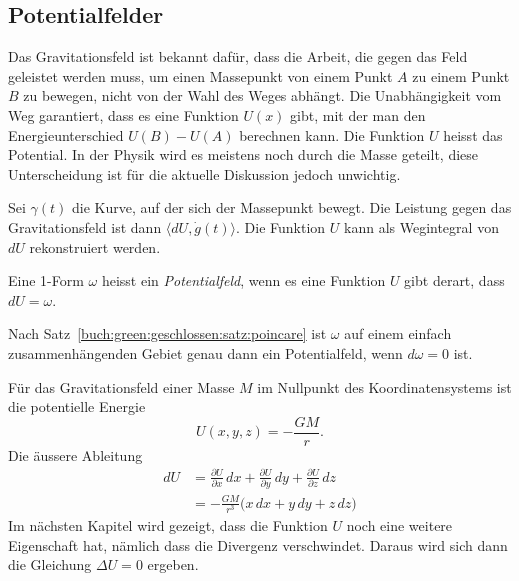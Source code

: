 %
%
\subsection{Potentialfelder}
Das Gravitationsfeld ist bekannt dafür, dass die Arbeit, die gegen
das Feld geleistet werden muss, um einen Massepunkt von einem Punkt $A$
zu einem Punkt $B$ zu bewegen, nicht von der Wahl des Weges abhängt.
Die Unabhängigkeit vom Weg garantiert, dass es
eine Funktion $U(x)$ gibt, mit der man den Energieunterschied
$U(B)-U(A)$ berechnen kann.
Die Funktion $U$ heisst das Potential.
In der Physik wird es meistens noch durch die Masse geteilt,
diese Unterscheidung ist für die aktuelle Diskussion jedoch unwichtig.

Sei $\gamma(t)$ die Kurve, auf der sich der Massepunkt 
bewegt.
Die Leistung gegen das Gravitationsfeld ist dann
$\langle dU, \dot{g}(t)\rangle$.
Die Funktion $U$ kann als Wegintegral von $dU$ rekonstruiert werden.

\begin{definition}[Potential]
Eine 1-Form $\omega$ heisst ein {\em Potentialfeld}, wenn es eine
Funktion $U$ gibt derart, dass $dU=\omega$.
\end{definition}

Nach Satz~\ref{buch:green:geschlossen:satz:poincare} ist $\omega$
auf einem einfach zusammenhängenden Gebiet genau dann ein Potentialfeld,
wenn $d\omega=0$ ist.

\begin{beispiel}
Für das Gravitationsfeld einer Masse $M$ im Nullpunkt des Koordinatensystems
ist die potentielle Energie
\[
U(x,y,z)
=
-\frac{GM}{r}.
\]
Die äussere Ableitung 
\begin{align*}
dU
&=
\frac{\partial U}{\partial x}\,dx
+
\frac{\partial U}{\partial y}\,dy
+
\frac{\partial U}{\partial z}\,dz
\\
&=
-\frac{GM}{r^3}\bigl(
x\,dx
+
y\,dy
+
z\,dz
\bigr)
\end{align*}
Im nächsten Kapitel wird gezeigt, dass die Funktion $U$ noch eine
weitere Eigenschaft hat, nämlich dass die Divergenz verschwindet.
Daraus wird sich dann die Gleichung $\Delta U=0$ ergeben.
\end{beispiel}

